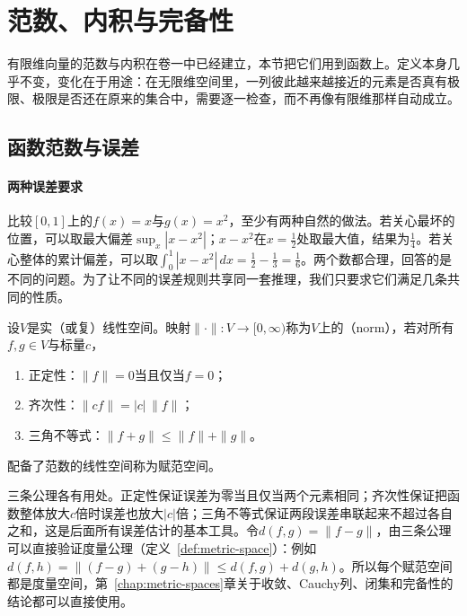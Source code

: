 
\section{范数、内积与完备性}
\label{sec:fs-norms-completeness}

有限维向量的范数与内积在卷一中已经建立，本节把它们用到函数上。定义本身几乎不变，变化在于用途：在无限维空间里，一列彼此越来越接近的元素是否真有极限、极限是否还在原来的集合中，需要逐一检查，而不再像有限维那样自动成立。

\subsection{函数范数与误差}
\label{sec:fs-norms}

\paragraph{两种误差要求}
比较$[0,1]$上的$f(x)=x$与$g(x)=x^2$，至少有两种自然的做法。若关心最坏的位置，可以取最大偏差$\sup_{x}|x-x^2|$；$x-x^2$在$x=\tfrac12$处取最大值，结果为$\tfrac14$。若关心整体的累计偏差，可以取$\int_0^1|x-x^2|\,dx=\tfrac12-\tfrac13=\tfrac16$。两个数都合理，回答的是不同的问题。为了让不同的误差规则共享同一套推理，我们只要求它们满足几条共同的性质。

\begin{definition}[范数]
\label{def:fs-norm}
设$V$是实（或复）线性空间。映射$\|\cdot\|:V\to[0,\infty)$称为$V$上的（norm），若对所有$f,g\in V$与标量$c$，
\begin{enumerate}
 \item 正定性：$\|f\|=0$当且仅当$f=0$；
 \item 齐次性：$\|cf\|=|c|\,\|f\|$；
 \item 三角不等式：$\|f+g\|\leq\|f\|+\|g\|$。
\end{enumerate}
配备了范数的线性空间称为赋范空间。
\end{definition}

三条公理各有用处。正定性保证误差为零当且仅当两个元素相同；齐次性保证把函数整体放大$c$倍时误差也放大$|c|$倍；三角不等式保证两段误差串联起来不超过各自之和，这是后面所有误差估计的基本工具。令$d(f,g)=\|f-g\|$，由三条公理可以直接验证度量公理（定义~\ref{def:metric-space}）：例如$d(f,h)=\|(f-g)+(g-h)\|\leq d(f,g)+d(g,h)$。所以每个赋范空间都是度量空间，第~\ref{chap:metric-spaces}章关于收敛、Cauchy列、闭集和完备性的结论都可以直接使用。

